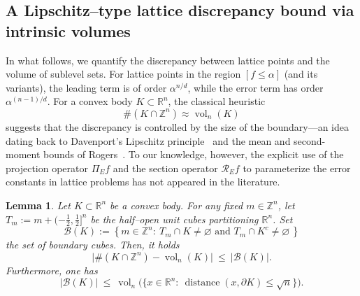 \documentclass[11pt]{article}
\newtheorem{lemma}[theorem]{Lemma}
\theoremstyle{definition}
\numberwithin{equation}{section}
\newcommand{\R}{\mathbb{R}}
\newcommand{\Z}{\mathbb{Z}}
\newcommand{\opV}{\mathds{V}}       %
\DeclareMathOperator{\vol}{vol}
\begin{document}
\subsection{A Lipschitz–type lattice discrepancy bound via intrinsic volumes}\label{sec:lipschitz}

In what follows, we quantify the discrepancy between lattice points and the volume of sublevel sets.
For lattice points in the region ${[f \le \alpha]}$ (and its variants), the leading term is of order $\alpha^{n/d}$, while the error term has order $\alpha^{(n-1)/d}$. 
For a convex body $K \subset \R^n$, the classical heuristic 
\[
\#(K \cap \Z^n) \approx \vol_n(K)
\]
suggests that the discrepancy is controlled by the size of the boundary—an idea dating back to 
Davenport’s Lipschitz principle~\cite{Davenport1951, Davenport1964Corr} and the mean and second-moment 
bounds of Rogers~\cite{Rogers1955, Rogers1956}. 
To our knowledge, however, the explicit use of the projection operator $\Pi_E f$ and the section operator 
$\mathscr{R}_E f$ to parameterize the error constants in lattice problems has not appeared in 
the literature. 

\begin{lemma}\label{lem:boundary-cubes}
Let $K\subset\R^n$ be a convex body.
For any fixed $m \in \mathbb Z^n$, let $T_m := m + (-\tfrac12,\tfrac12]^n$ be the half–open unit cubes partitioning $\R^n$.
Set
\[
  \mathcal B(K) := \left\{ m \in \Z^n:\ T_m\cap K\neq\varnothing\text{ and }T_m\cap K^c\neq\varnothing\,\right\}
\]
the set of boundary cubes.
Then, it holds
\begin{equation}
  \big|\#(K\cap\Z^n)-\vol_n(K)\big|\ \le\ |\mathcal B(K)|.
\end{equation}
Furthermore, one has
\begin{equation}\label{discre_bounda}
  |\mathcal B(K)|\ \le\ \vol_n\big(\{x\in\R^n:\ \operatorname{distance}(x,\partial K)\le \sqrt n\}\big).
\end{equation}
\end{lemma}
\end{document}
